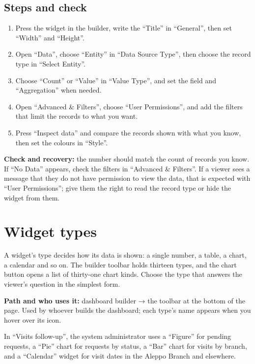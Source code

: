 \subsection{Steps and check}
\begin{enumerate}
\item Press the widget in the builder, write the “Title” in “General”, then set “Width” and “Height”.
\item Open “Data”, choose “Entity” in “Data Source Type”, then choose the record type in “Select Entity”.
\item Choose “Count” or “Value” in “Value Type”, and set the field and “Aggregation” when needed.
\item Open “Advanced \& Filters”, choose “User Permissions”, and add the filters that limit the records to what you want.
\item Press “Inspect data” and compare the records shown with what you know, then set the colours in “Style”.
\end{enumerate}

\textbf{Check and recovery:} the number should match the count of records you know. If “No Data” appears, check the filters in “Advanced \& Filters”. If a viewer sees a message that they do not have permission to view the data, that is expected with “User Permissions”; give them the right to read the record type or hide the widget from them.

\clearpage
\section{Widget types}
\label{sec:builder-feature-dashboards-widgets}

A widget's type decides how its data is shown: a single number, a table, a chart, a calendar and so on. The builder toolbar holds thirteen types, and the chart button opens a list of thirty-one chart kinds. Choose the type that answers the viewer's question in the simplest form.

\textbf{Path and who uses it:} dashboard builder → the toolbar at the bottom of the page. Used by whoever builds the dashboard; each type's name appears when you hover over its icon.

\begin{rcnote}
In “Visits follow-up”, the system administrator uses a “Figure” for pending requests, a “Pie” chart for requests by status, a “Bar” chart for visits by branch, and a “Calendar” widget for visit dates in the Aleppo Branch and elsewhere.
\end{rcnote}

